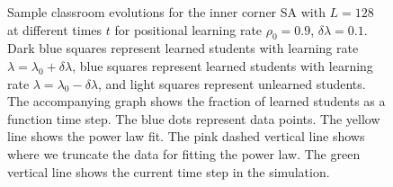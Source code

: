 \begin{figure}[htbp!]
   \caption{Sample classroom evolutions for the inner corner SA with $L=128$ at different times $t$ for positional learning rate $\rho_0=0.9$, $\delta\lambda = 0.1$.
   Dark blue squares represent learned students with learning rate $\lambda = \lambda_0 + \delta\lambda$, blue squares represent learned students with learning rate $\lambda = \lambda_0 - \delta\lambda$, and light squares represent unlearned students.
   The accompanying graph shows the fraction of learned students as a function time step.
   The blue dots represent data points. 
   The yellow line shows the power law fit.
   The pink dashed vertical line shows where we truncate the data for fitting the power law.
   The green vertical line shows the current time step in the simulation.
   }
   \label{fig:2DBPCAIH sample class evolution high rho}
\end{figure}

